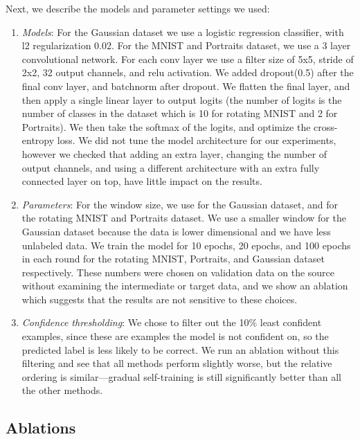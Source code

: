 \documentclass[11pt]{article}
\begin{document}
Next, we describe the models and parameter settings we used:
\begin{enumerate}

	\item \emph{Models}: For the Gaussian dataset we use a logistic regression classifier, with l2 regularization 0.02. For the MNIST and Portraits dataset, we use a 3 layer convolutional network. For each conv layer we use a filter size of 5x5, stride of 2x2, 32 output channels, and relu activation. We added dropout(0.5) after the final conv layer, and batchnorm after dropout. We flatten the final layer, and then apply a single linear layer to output logits (the number of logits is the number of classes in the dataset which is 10 for rotating MNIST and 2 for Portraits). We then take the softmax of the logits, and optimize the cross-entropy loss. We did not tune the model architecture for our experiments, however we checked that adding an extra layer, changing the number of output channels, and using a different architecture with an extra fully connected layer on top, have little impact on the results. 

	\item \emph{Parameters}: For the window size, we use  for the Gaussian dataset, and  for the rotating MNIST and Portraits dataset. We use a smaller window for the Gaussian dataset because the data is lower dimensional and we have less unlabeled data. We train the model for 10 epochs, 20 epochs, and 100 epochs in each round for the rotating MNIST, Portraits, and Gaussian dataset respectively. These numbers were chosen on validation data on the source without examining the intermediate or target data, and we show an ablation which suggests that the results are not sensitive to these choices.

	\item \emph{Confidence thresholding}: We chose  to filter out the 10\% least confident examples, since these are examples the model is not confident on, so the predicted label is less likely to be correct. We run an ablation without this filtering and see that all methods perform slightly worse, but the relative ordering is similar---gradual self-training is still significantly better than all the other methods.

\end{enumerate}

\subsection{Ablations}
\end{document}
